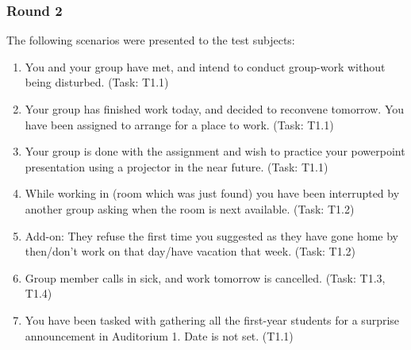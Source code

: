 \subsubsection{Round 2}
The following scenarios were presented to the test subjects:
\begin{enumerate}
\item You and your group have met, and intend to conduct group-work without being disturbed. (Task: T1.1)
\item Your group has finished work today, and decided to reconvene tomorrow. You have been assigned to arrange for a place to work. (Task: T1.1)
\item Your group is done with the assignment and wish to practice your powerpoint presentation using a projector in the near future. (Task: T1.1)
\item While working in (room which was just found) you have been interrupted by another group asking when the room is next available. (Task: T1.2)
\item Add-on: They refuse the first time you suggested as they have gone home by then/don't work on that day/have vacation that week. (Task: T1.2)
\item Group member calls in sick, and work tomorrow is cancelled. (Task: T1.3, T1.4)
\item You have been tasked with gathering all the first-year students for a surprise announcement in Auditorium 1. Date is not set. (T1.1)
\end{enumerate}

